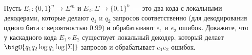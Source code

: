 Пусть $E_1\colon \{0, 1\}^n \to \Sigma^m$ и $E_2\colon \Sigma \to \{0, 1\}^k$~--- это два кода с
локальными декодерами, которые делают $q_1$ и $q_2$ запросов соответственно (для декодирования одного
бита с вероятностью $0.99$) и обрабатывают $e_1$ и $e_2$ ошибок. Докажите, что у каскадного кода $E_1
\circ E_2$ существует локальный декодер, который делает $\bigO{q_1 q_2 \log q_1 \log |\Sigma|}$ запросов
и обрабатывает $e_1 e_2$ ошибок.